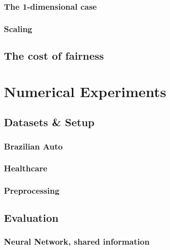 \documentclass[
  a4paper,
  11pt,
  a4paper,
  twoside,
  openright]{report}
\begin{document}
\subsection{The 1-dimensional case}\label{the-1-dimensional-case}

\subsection{Scaling}\label{scaling}

\section{The cost of fairness}\label{the-cost-of-fairness}


\chapter{Numerical Experiments}\label{numerical-experiments}

\section{Datasets \& Setup}\label{datasets-setup}

\subsection{Brazilian Auto}\label{brazilian-auto}

\subsection{Healthcare}\label{healthcare}

\subsection{Preprocessing}\label{preprocessing}

\section{Evaluation}\label{evaluation}

\subsection{Neural Network, shared
information}\label{neural-network-shared-information-1}
\end{document}
